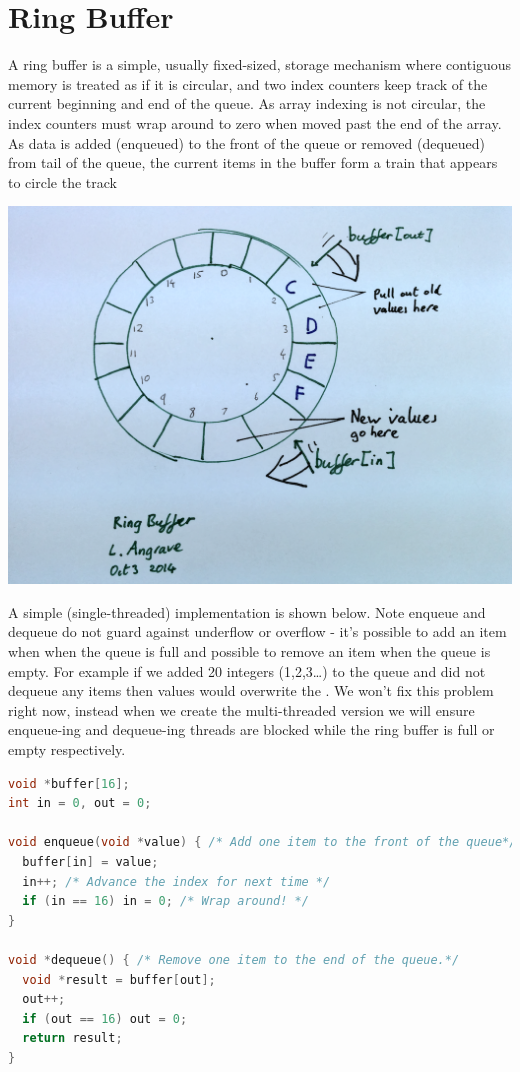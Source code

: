 \section{Ring Buffer}\label{Ring Buffer}

A ring buffer is a simple, usually fixed-sized, storage mechanism where contiguous memory is treated as if it is circular, and two index counters keep track of the current beginning and end of the queue. As array indexing is not circular, the index counters must wrap around to zero when moved past the end of the array. As data is added (enqueued) to the front of the queue or removed (dequeued) from tail of the queue, the current items in the buffer form a train that appears to circle the track 

\begin{center}
\includegraphics[width=.5\textwidth]{synchronization/images/ring_buffer.png}
\end{center}

A simple (single-threaded) implementation is shown below. Note enqueue and dequeue do not guard against underflow or overflow - it's possible to add an item when when the queue is full and possible to remove an item when the queue is empty. For example if we added 20 integers (1,2,3\ldots{}) to the queue and did not dequeue any items then values  would overwrite the . We won't fix this problem right now, instead when we create the multi-threaded version we will ensure enqueue-ing and dequeue-ing threads are blocked while the ring buffer is full or empty respectively.

\begin{lstlisting}[language=C]
void *buffer[16];
int in = 0, out = 0;

void enqueue(void *value) { /* Add one item to the front of the queue*/
  buffer[in] = value;
  in++; /* Advance the index for next time */
  if (in == 16) in = 0; /* Wrap around! */
}

void *dequeue() { /* Remove one item to the end of the queue.*/
  void *result = buffer[out];
  out++;
  if (out == 16) out = 0;
  return result;
}
\end{lstlisting}

